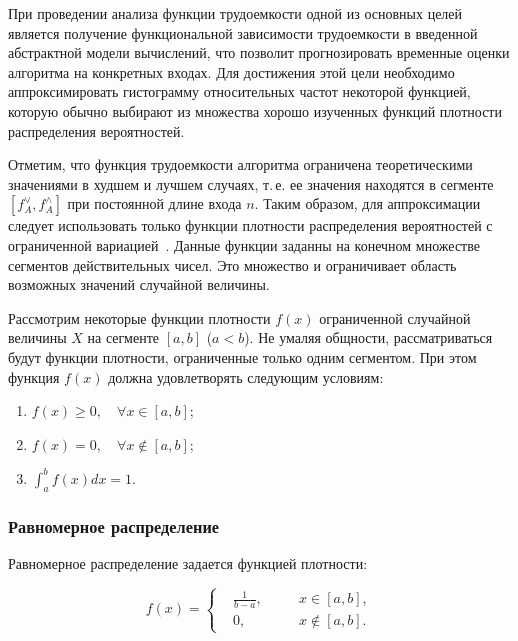 \documentclass[a4paper, article, 14pt]{extarticle}
\begin{document}
При проведении анализа функции трудоемкости одной из основных целей является получение функциональной зависимости трудоемкости в введенной абстрактной модели вычислений, что позволит прогнозировать временные оценки алгоритма на конкретных входах. Для достижения этой цели необходимо аппроксимировать гистограмму относительных частот некоторой функцией, которую обычно выбирают из множества хорошо изученных функций плотности распределения вероятностей.

Отметим, что функция трудоемкости алгоритма ограничена теоретическими значениями в худшем и лучшем случаях, т.\,е. ее значения находятся в сегменте $[f_A^\vee, f_A^\wedge]$ при постоянной длине входа $n$. Таким образом, для аппроксимации следует использовать только функции плотности распределения вероятностей с ограниченной вариацией~\cite{petrushyn_ulyanov_definitions}. Данные функции заданны на конечном множестве сегментов действительных чисел. Это множество и ограничивает область возможных значений случайной величины.

Рассмотрим некоторые функции плотности $f(x)$ ограниченной случайной величины $X$ на сегменте $[a, b]$ ($a < b$). Не умаляя общности, рассматриваться будут функции плотности, ограниченные только одним сегментом. При этом функция $f(x)$ должна удовлетворять следующим условиям:

\begin{enumerate}
	\item $f(x) \geq 0, \quad \forall x \in [a, b]$;

	\item $f(x) = 0, \quad \forall x \notin [a, b]$;

	\item $\int_{a}^{b}{f(x) dx} = 1$.
\end{enumerate}

\subsubsection{Равномерное распределение}\label{sec:uniform_distribtuion}

Равномерное распределение задается функцией плотности:

\begin{equation}\label{eq:uniform_distribtuion}
	f(x) =
	\left\{
		\begin{aligned}
			&\frac{1}{b - a}, \quad && x \in [a, b],\\
			&0, \quad && x \notin [a, b].
		\end{aligned}
	\right.
\end{equation}
\end{document}
